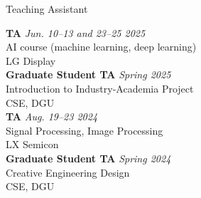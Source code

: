 \begin{rSection}{Teaching Assistant}

{\bf \acf{TA}} \hfill {\em Jun. 10--13 and 23--25 2025} \\
AI course (machine learning, deep learning)\\
LG Display\\

{\bf Graduate Student \acf{TA}} \hfill {\em Spring 2025} \\
Introduction to Industry-Academia Project\\
\acf{CSE}, \acf{DGU}\\

{\bf \acf{TA}} \hfill {\em Aug. 19--23 2024} \\
Signal Processing, Image Processing\\
LX Semicon\\

{\bf Graduate Student \acf{TA}} \hfill {\em Spring 2024} \\
Creative Engineering Design\\
\acf{CSE}, \acf{DGU}\\

\end{rSection}
    